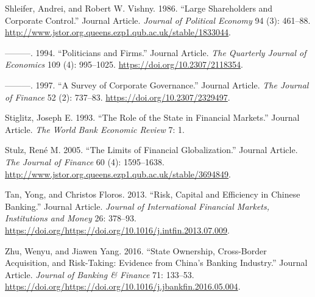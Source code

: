 \documentclass{article}
\begin{document}
\leavevmode\hypertarget{ref-RN71}{}%
Shleifer, Andrei, and Robert W. Vishny. 1986. ``Large Shareholders and
Corporate Control.'' Journal Article. \emph{Journal of Political
Economy} 94 (3): 461--88.
\url{http://www.jstor.org.queens.ezp1.qub.ac.uk/stable/1833044}.

\leavevmode\hypertarget{ref-RN72}{}%
---------. 1994. ``Politicians and Firms.'' Journal Article. \emph{The
Quarterly Journal of Economics} 109 (4): 995--1025.
\url{https://doi.org/10.2307/2118354}.

\leavevmode\hypertarget{ref-RN4}{}%
---------. 1997. ``A Survey of Corporate Governance.'' Journal Article.
\emph{The Journal of Finance} 52 (2): 737--83.
\url{https://doi.org/10.2307/2329497}.

\leavevmode\hypertarget{ref-RN73}{}%
Stiglitz, Joseph E. 1993. ``The Role of the State in Financial
Markets.'' Journal Article. \emph{The World Bank Economic Review} 7: 1.

\leavevmode\hypertarget{ref-RN74}{}%
Stulz, René M. 2005. ``The Limits of Financial Globalization.'' Journal
Article. \emph{The Journal of Finance} 60 (4): 1595--1638.
\url{http://www.jstor.org.queens.ezp1.qub.ac.uk/stable/3694849}.

\leavevmode\hypertarget{ref-RN75}{}%
Tan, Yong, and Christos Floros. 2013. ``Risk, Capital and Efficiency in
Chinese Banking.'' Journal Article. \emph{Journal of International
Financial Markets, Institutions and Money} 26: 378--93.
\url{https://doi.org/https://doi.org/10.1016/j.intfin.2013.07.009}.

\leavevmode\hypertarget{ref-RN78}{}%
Zhu, Wenyu, and Jiawen Yang. 2016. ``State Ownership, Cross-Border
Acquisition, and Risk-Taking: Evidence from China's Banking Industry.''
Journal Article. \emph{Journal of Banking \& Finance} 71: 133--53.
\url{https://doi.org/https://doi.org/10.1016/j.jbankfin.2016.05.004}.



\end{document}
